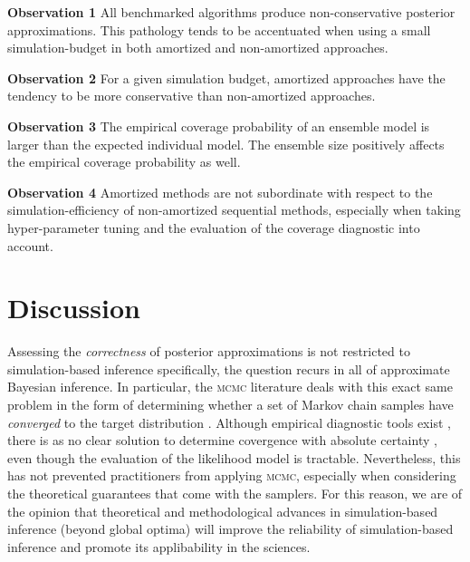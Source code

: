 \documentclass[twoside]{article}
\begin{document}
\medskip

\protect\begin{custombox}
{\bfseries Observation 1} All benchmarked algorithms produce non-conservative posterior approximations. This pathology tends to be accentuated when using a small simulation-budget in both amortized and non-amortized approaches.

\medskip

{\bfseries Observation 2} For a given simulation budget, amortized approaches have the tendency to be more conservative than non-amortized approaches. 

\medskip

{\bfseries Observation 3} The empirical coverage probability of an ensemble model is larger than the expected individual model. The ensemble size positively affects the empirical coverage probability as well.

\medskip

{\bfseries Observation 4} Amortized methods are not subordinate with respect to the simulation-efficiency of non-amortized sequential methods, especially when taking hyper-parameter tuning and the evaluation of the coverage diagnostic into account.
\end{custombox}
\section{Discussion}
\label{sec:discussion}
Assessing the \emph{correctness} of posterior approximations is not restricted to simulation-based inference specifically, the question recurs in all of approximate Bayesian inference. 
In particular, the \textsc{mcmc} literature deals with this exact same problem in the form of determining whether a set of Markov chain samples have \emph{converged} to the target distribution \citep{lin2014integrated,hogg2018data}. 
Although empirical diagnostic tools exist \citep{geweke1991evaluating,gelman1992inference,raftery1991many,dixit2017mcmc},
there is as no clear solution to determine covergence with absolute certainty \citep{dixit2018developments,roy2020convergence}, even though the evaluation of the likelihood model is tractable.
Nevertheless, this has not prevented practitioners from applying \textsc{mcmc}, especially when considering the theoretical guarantees that come with the samplers. For this reason, we are of the opinion that theoretical and methodological advances in simulation-based inference (beyond global optima) will improve the reliability of simulation-based inference and promote its applibability in the sciences.
\end{document}
